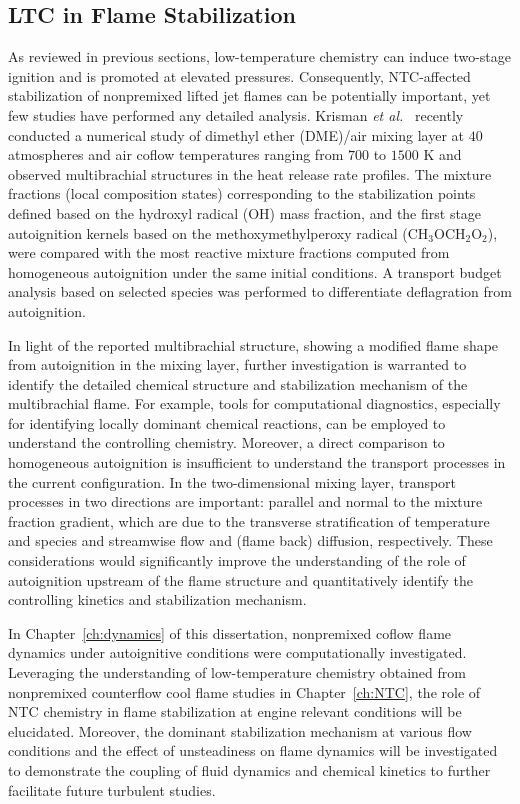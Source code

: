 \subsection{LTC in Flame Stabilization}\label{sec:intro-NTC-stabilization}

As reviewed in previous sections, low-temperature chemistry can induce two-stage ignition and is promoted at elevated pressures.  Consequently, NTC-affected stabilization of nonpremixed lifted jet flames can be potentially important, yet few studies have performed any detailed analysis.  Krisman \emph{et al.}~\cite{krisman15} recently conducted a numerical study of dimethyl ether (DME)/air mixing layer at $40$ atmospheres and air coflow temperatures ranging from $700$ to $1500$ K and observed multibrachial structures in the heat release rate profiles.  The mixture fractions (local composition states) corresponding to the stabilization points defined based on the hydroxyl radical (OH) mass fraction, and the first stage autoignition kernels based on the methoxymethylperoxy radical (CH$_3$OCH$_2$O$_2$), were compared with the most reactive mixture fractions computed from homogeneous autoignition under the same initial conditions.  A transport budget analysis based on selected species was performed to differentiate deflagration from autoignition.

In light of the reported multibrachial structure, showing a modified flame shape from autoignition in the mixing layer, further investigation is warranted to identify the detailed chemical structure and stabilization mechanism of the multibrachial flame.  For example, tools for computational diagnostics, especially for identifying locally dominant chemical reactions, can be employed to understand the controlling chemistry.  Moreover, a direct comparison to homogeneous autoignition is insufficient to understand the transport processes in the current configuration.  In the two-dimensional mixing layer, transport processes in two directions are important: parallel and normal to the mixture fraction gradient, which are due to the transverse stratification of temperature and species and streamwise flow and (flame back) diffusion, respectively.  These considerations would significantly improve the understanding of the role of autoignition upstream of the flame structure and quantitatively identify the controlling kinetics and stabilization mechanism.

In Chapter~\ref{ch:dynamics} of this dissertation, nonpremixed coflow flame dynamics under autoignitive conditions were computationally investigated.  Leveraging the understanding of low-temperature chemistry obtained from nonpremixed counterflow cool flame studies in Chapter~\ref{ch:NTC}, the role of NTC chemistry in flame stabilization at engine relevant conditions will be elucidated.  Moreover, the dominant stabilization mechanism at various flow conditions and the effect of unsteadiness on flame dynamics will be investigated to demonstrate the coupling of fluid dynamics and chemical kinetics to further facilitate future turbulent studies.

